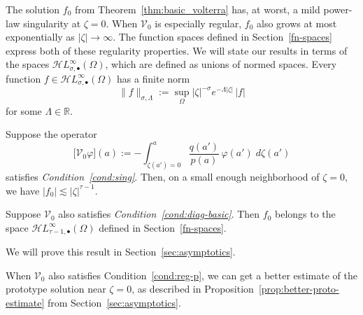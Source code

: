 \documentclass[final]{siamart220329}
\newcommand{\R}{\mathbb{R}}
\newcommand{\singexp}[2]{\mathcal{H}L^\infty_{#1, #2}}
\newcommand{\singexpalg}[1]{\singexp{#1}{\bullet}}
\newcommand{\hardpart}{\mathcal{V}_0}
\newcommand{\solproto}{f_0}
\newcommand{\domain}{\Omega}
\newenvironment{revtwo}{\color{revred}}{\color{black}}
\newenvironment{revtwo}{}{}
\begin{document}
The solution $\solproto$ from Theorem~\ref{thm:basic_volterra} has, at worst, a mild power-law singularity at $\zeta = 0$. When $\hardpart$ is especially regular, $\solproto$ also grows at most exponentially as $|\zeta| \to \infty$. The function spaces defined in Section~\ref{fn-spaces} express both of these regularity properties. \begin{revtwo}We will state our results in terms of the spaces $\singexpalg{\sigma}(\domain)$, which are defined as unions of normed spaces. Every function $f \in \singexpalg{\sigma}(\domain)$ has a finite norm
\[ \|f\|_{\sigma,\Lambda} := \sup_\Omega |\zeta|^{-\sigma} e^{-\Lambda|\zeta|}\,|f| \]
for some $\Lambda \in \R$.
\end{revtwo}
\begin{theorem}\label{thm:proto-growth}
\begin{revtwo}Suppose the operator
\[ \big[\hardpart \varphi\big](a) := - \int_{\zeta(a')=0}^{a} \frac{q(a')}{p(a)}\,\varphi(a')\;d\zeta(a') \]
\end{revtwo}
satisfies {\em Condition~\eqref{cond:sing}}. Then, on a small enough neighborhood of $\zeta = 0$, we have $|\solproto| \lesssim |\zeta|^{\tau-1}$.

Suppose $\hardpart$ also satisfies {\em Condition~\eqref{cond:diag-basic}}. Then $f_0$ belongs to the space $\singexpalg{\tau-1}(\domain)$ defined in Section~\ref{fn-spaces}.
\end{theorem}
We will prove this result in Section~\ref{sec:asymptotics}.
\begin{rmk}
When $\hardpart$ also satisfies Condition~\eqref{cond:reg-p}, we can get a better estimate of the prototype solution near $\zeta = 0$, as described in Proposition~\ref{prop:better-proto-estimate} from Section~\ref{sec:asymptotics}.
\end{rmk}
\end{document}
